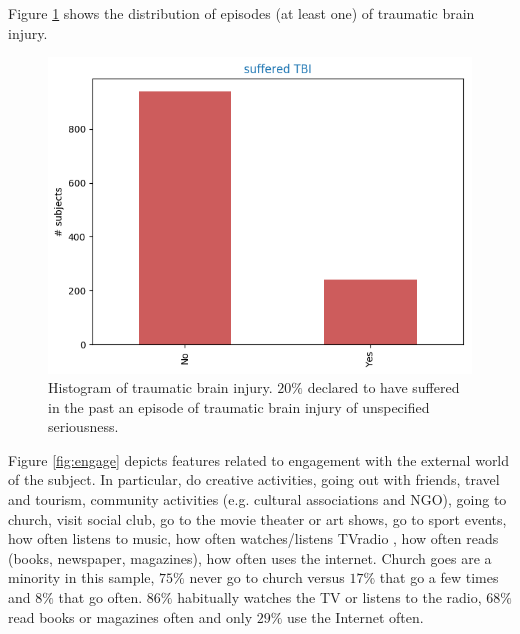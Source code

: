 \documentclass[11pt]{article}
\theoremstyle{definition}
\theoremstyle{remark}
\begin{document}
Figure \ref{fig:tce} shows the distribution of episodes (at least one) of traumatic brain injury. 
\begin{figure}[H]
        \centering
        \includegraphics[keepaspectratio, width=0.5\linewidth]{figures/Fig_tce}
        \caption{Histogram of traumatic brain injury. $20\%$ declared to have suffered in the past an episode of  traumatic brain injury of unspecified seriousness.} 
        \label{fig:tce}
\end{figure}


Figure \ref{fig:engage} depicts features related to engagement with the external world of the subject. In particular, do creative activities,  
going out with friends, travel and tourism, community activities (e.g. cultural associations and NGO), going to church, visit social club, go to the movie theater or art shows, go to sport events, how often listens to music, how often watches/listens TVradio , how often reads (books, newspaper, magazines), how often uses the internet.
Church goes are a minority in this sample, $75\%$ never go to church versus $17\%$ that go a few times and $8\%$ that go often. $86\%$ habitually watches the TV or listens to the radio, $68\%$ read books or magazines often and only $29\%$ use the Internet often.
\end{document}
